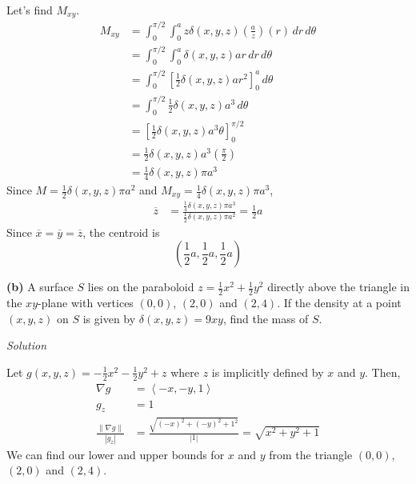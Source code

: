 \documentclass{article}
\newcommand{\lrp}[1]{\left( #1 \right)}
\newcommand{\lra}[1]{\left\langle #1 \right\rangle}
\newcommand{\lrb}[1]{\left[ #1 \right]}
\newcommand{\norm}[1]{\left\lVert #1 \right\rVert}
\newcommand{\Solution}{\textit{Solution}}
\begin{document}
Let's find $M_{xy}$.
\begin{align*}
    M_{xy}&=\int_0^{\pi/2}\int_0^a z\delta(x,y,z)\lrp{\frac{a}{z}}\lrp{r}\,dr\,d\theta\\
    &=\int_0^{\pi/2}\int_0^a \delta(x,y,z)ar\,dr\,d\theta\\
    &=\int_0^{\pi/2}\lrb{\frac{1}{2}\delta(x,y,z)ar^2}_0^a\,d\theta\\
    &=\int_0^{\pi/2}\frac{1}{2}\delta(x,y,z)a^3\,d\theta\\
    &=\lrb{\frac{1}{2}\delta(x,y,z)a^3\theta}_0^{\pi/2}\\
    &=\frac{1}{2}\delta(x,y,z)a^3\lrp{\frac{\pi}{2}}\\
    &=\frac{1}{4}\delta(x,y,z)\pi a^3
\end{align*}
Since $\displaystyle M=\frac{1}{2}\delta(x,y,z)\pi a^2$ and $\displaystyle M_{xy}=\frac{1}{4}\delta(x,y,z)\pi a^3$,
\begin{align*}
    \overline{z}&=\frac{\frac{1}{4}\delta(x,y,z)\pi a^3}{\frac{1}{2}\delta(x,y,z)\pi a^2}=\frac{1}{2}a
\end{align*}
Since $\overline{x}=\overline{y}=\overline{z}$, the centroid is
\begin{equation*}
    \boxed{\lrp{\frac{1}{2}a,\frac{1}{2}a,\frac{1}{2}a}}
\end{equation*}

{}\textbf{(b)} A surface $S$ lies on the paraboloid $z=\frac{1}{2}x^2+\frac{1}{2}y^2$ directly above the triangle in the $xy$-plane with vertices $(0,0)$, $(2,0)$ and $(2,4)$. If the density at a point $(x,y,z)$ on $S$ is given by $\delta(x,y,z)=9xy$, find the mass of $S$.

\Solution

Let $g(x,y,z)=-\frac{1}{2}x^2-\frac{1}{2}y^2+z$ where $z$ is implicitly defined by $x$ and $y$. Then,
\begin{align*}
    \nabla g&=\lra{-x,-y,1}\\
    g_z&=1\\
    \frac{\norm{\nabla g}}{\left|g_z\right|}&=\frac{\sqrt{(-x)^2+(-y)^2+1^2}}{\left|1\right|}={\sqrt{x^2+y^2+1}}
\end{align*}
We can find our lower and upper bounds for $x$ and $y$ from the triangle $(0,0)$, $(2,0)$ and $(2,4)$.
\end{document}

